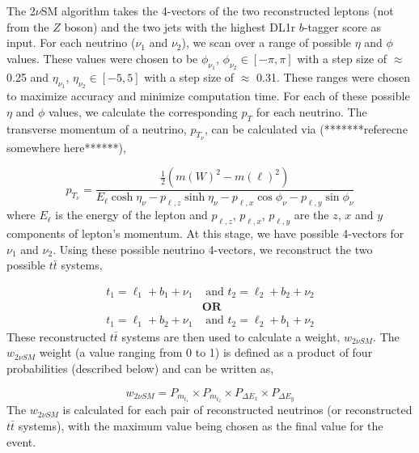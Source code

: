 The 2$\nu$SM algorithm takes the 4-vectors of the two reconstructed leptons (not from the $Z$ boson) and the two jets with the highest DL1r $b$-tagger score as input. For each neutrino ($\nu_{1}$ and $\nu_{2}$), we scan over a range of possible $\eta$ and $\phi$ values. These values were chosen to be $\phi_{\nu_{1}}$, $\phi_{\nu_{2}} \in [-\pi,\pi]$ with a step size of $\approx$ 0.25 and $\eta_{\nu_{1}}$, $\eta_{\nu_{2}} \in [-5,5]$ with a step size of $\approx$ 0.31. These ranges were chosen to maximize accuracy and minimize computation time. For each of these possible $\eta$ and $\phi$ values, we calculate the corresponding $p_{T}$ for each neutrino. The transverse momentum of a neutrino, $p_{{T}_{\nu}}$, can be calculated via (*******referecne somewhere here******),

\begin{equation}
    p_{{T}_{\nu}} = \frac{\frac{1}{2} (m(W)^{2} - m(\ell)^{2})}{E_{\ell}\cosh{\eta_{\nu}} - p_{\ell,z}\sinh{\eta_{\nu}} - p_{\ell,x}\cos{\phi_{\nu}} - p_{\ell,y}\sin{\phi_{\nu}} }
\end{equation}
where $E_{\ell}$ is the energy of the lepton and $p_{\ell, z}$, $p_{\ell, x}$, $p_{\ell, y}$ are the $z$, $x$ and $y$ components of lepton's momentum. At this stage, we have possible 4-vectors for $\nu_{1}$ and $\nu_{2}$. Using these possible neutrino 4-vectors, we reconstruct the two possible $t\bar{t}$ systems,

\begin{align}
    t_{1} = \ell_{1} + b_{1} + \nu_{1} &\text{ and } t_{2} = \ell_{2} + b_{2} + \nu_{2} \label{eq:top1-2vSM}\\
    &\textbf{OR}\nonumber\\ 
     t_{1} = \ell_{1} + b_{2} + \nu_{1} &\text{ and } t_{2} = \ell_{2} + b_{1} + \nu_{2} \label{eq:top2-2vSM}
\end{align}
These reconstructed $t\bar{t}$ systems are then used to calculate a weight, $w_{2\nu SM}$. The $w_{2\nu SM}$ weight (a value ranging from 0 to 1) is defined as a product of four probabilities (described below) and can be written as,

\begin{equation}
    w_{2\nu SM} = P_{m_{t_{1}}} \times P_{m_{t_{2}}} \times P_{\Delta E_{x}} \times P_{\Delta E_{y}}
\end{equation}
The $w_{2\nu SM}$ is calculated for each pair of reconstructed neutrinos (or reconstructed $t\bar{t}$ systems), with the maximum value being chosen as the final value for the event.

